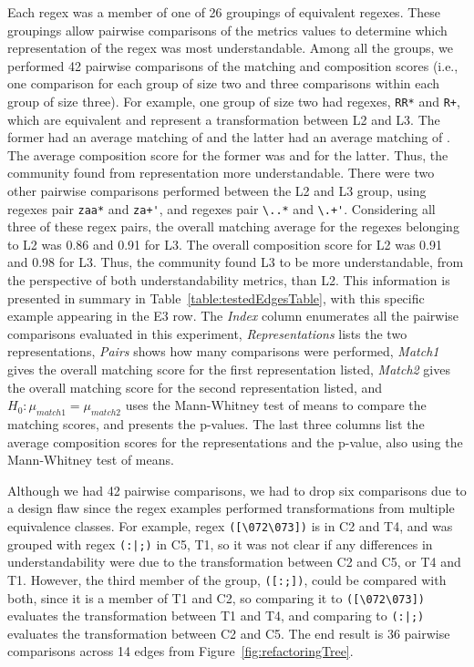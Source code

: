 Each regex was a member of one of 26 groupings of equivalent regexes. These groupings allow pairwise comparisons of the metrics values to determine which representation of the regex was most understandable. Among all the groups, we performed 42 pairwise comparisons of the matching and composition scores  (i.e., one comparison for each group of size two and three comparisons within each group of size three). 
For example, one group of size two had regexes, \verb!RR*! and \verb!R+!, which are equivalent and represent a transformation between L2 and L3. The former had an average matching of  and the latter had an average matching of . The average composition score for the former was  and  for the latter. Thus, the community found  from representation  more understandable. There were two other pairwise comparisons performed between the L2 and L3 group, using regexes pair \verb!zaa*! and \verb!za+'!, and regexes pair \verb!\..*! and \verb!\.+'!. Considering all three of these regex pairs, the overall matching average for the regexes belonging to L2 was 0.86 and 0.91 for L3. The overall composition score for L2 was 0.91 and 0.98 for L3. Thus, the community found L3 to be more understandable, from the perspective of both understandability metrics, than L2. 
This information is presented in summary in Table~\ref{table:testedEdgesTable}, with this specific example appearing in the E3 row. The \emph{Index} column enumerates all the pairwise comparisons evaluated in this experiment, \emph{Representations} lists the two representations, \emph{Pairs} shows how many comparisons were performed, \emph{Match1} gives the overall matching score for the first representation listed, \emph{Match2} gives the overall matching score for the second representation listed, and $H_0: \mu_{match1} = \mu_{match2}$ uses the Mann-Whitney test of means to compare the matching scores, and presents the p-values. The last three columns list the average composition scores for the representations and the p-value, also using the Mann-Whitney test of means. 

%
%
%
%
%


Although we had 42 pairwise comparisons,  we had to drop six comparisons  due to a design flaw since the regex examples performed transformations from multiple equivalence classes. For example, regex \verb!([\072\073])! is in C2 and T4, and was grouped with regex \verb!(:|;)! in C5, T1, so it was not clear if any differences in understandability were due to the transformation between C2 and C5, or T4 and T1. However, the third member of the group, \verb!([:;])!, could be compared with both, since it is a member of T1 and C2, so comparing it to \verb!([\072\073])! evaluates the transformation between T1 and T4, and comparing to \verb!(:|;)! evaluates the transformation between C2 and C5. The end result is 36 pairwise comparisons across 14 edges from Figure~\ref{fig:refactoringTree}. 


